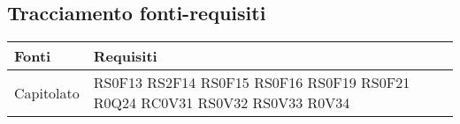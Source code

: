 \subsection{Tracciamento fonti-requisiti}
\begin{center}
\bgroup
\def\arraystretch{1.8}
\begin{longtable}{|p{5cm}|p{5cm}|} \hline
\textbf{Fonti} & \textbf{Requisiti} \\\hline
Capitolato & RS0F13 \newline RS2F14 \newline RS0F15 \newline RS0F16 \newline RS0F19 \newline RS0F21 \newline R0Q24 \newline RC0V31 \newline RS0V32 \newline RS0V33 \newline R0V34 \\\hline

\end{longtable}
\end{center}
